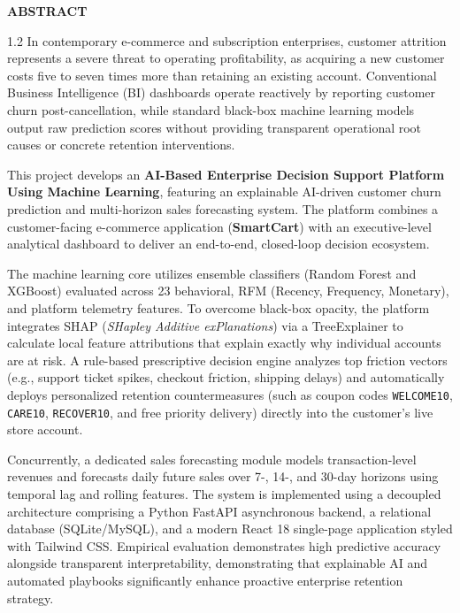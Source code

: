 \documentclass[12pt,a4paper]{article}
\begin{document}
\vspace*{0.3in}
\begin{center}{\large\bfseries ABSTRACT}\end{center}
\vspace{0.1in}
\begin{spacing}{1.2}
\setlength{\parskip}{5pt}
\justifying
In contemporary e-commerce and subscription enterprises, customer attrition represents a severe threat to operating profitability, as acquiring a new customer costs five to seven times more than retaining an existing account. Conventional Business Intelligence (BI) dashboards operate reactively by reporting customer churn post-cancellation, while standard black-box machine learning models output raw prediction scores without providing transparent operational root causes or concrete retention interventions. 

This project develops an \textbf{AI-Based Enterprise Decision Support Platform Using Machine Learning}, featuring an explainable AI-driven customer churn prediction and multi-horizon sales forecasting system. The platform combines a customer-facing e-commerce application (\textbf{SmartCart}) with an executive-level analytical dashboard to deliver an end-to-end, closed-loop decision ecosystem. 

The machine learning core utilizes ensemble classifiers (Random Forest and XGBoost) evaluated across 23 behavioral, RFM (Recency, Frequency, Monetary), and platform telemetry features. To overcome black-box opacity, the platform integrates SHAP (\textit{SHapley Additive exPlanations}) via a TreeExplainer to calculate local feature attributions that explain exactly why individual accounts are at risk. A rule-based prescriptive decision engine analyzes top friction vectors (e.g., support ticket spikes, checkout friction, shipping delays) and automatically deploys personalized retention countermeasures (such as coupon codes \texttt{WELCOME10}, \texttt{CARE10}, \texttt{RECOVER10}, and free priority delivery) directly into the customer's live store account. 

Concurrently, a dedicated sales forecasting module models transaction-level revenues and forecasts daily future sales over 7-, 14-, and 30-day horizons using temporal lag and rolling features. The system is implemented using a decoupled architecture comprising a Python FastAPI asynchronous backend, a relational database (SQLite/MySQL), and a modern React 18 single-page application styled with Tailwind CSS. Empirical evaluation demonstrates high predictive accuracy alongside transparent interpretability, demonstrating that explainable AI and automated playbooks significantly enhance proactive enterprise retention strategy.
\end{spacing}
\newpage
\end{document}
